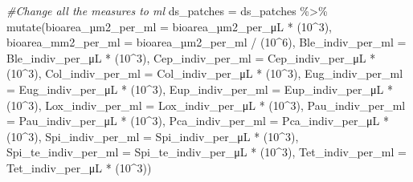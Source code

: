 \documentclass[
]{article}
\newenvironment{Shaded}{\begin{snugshade}}{\end{snugshade}}
\newcommand{\AttributeTok}[1]{\textcolor[rgb]{0.77,0.63,0.00}{#1}}
\newcommand{\CommentTok}[1]{\textcolor[rgb]{0.56,0.35,0.01}{\textit{#1}}}
\newcommand{\DecValTok}[1]{\textcolor[rgb]{0.00,0.00,0.81}{#1}}
\newcommand{\FunctionTok}[1]{\textcolor[rgb]{0.00,0.00,0.00}{#1}}
\newcommand{\NormalTok}[1]{#1}
\newcommand{\OtherTok}[1]{\textcolor[rgb]{0.56,0.35,0.01}{#1}}
\newcommand{\SpecialCharTok}[1]{\textcolor[rgb]{0.00,0.00,0.00}{#1}}
\begin{document}
\begin{Shaded}
\begin{Highlighting}[]
\CommentTok{\#Change all the measures to ml}
\NormalTok{ds\_patches }\OtherTok{=}\NormalTok{ ds\_patches }\SpecialCharTok{\%\textgreater{}\%}
  \FunctionTok{mutate}\NormalTok{(bioarea\_µ}\AttributeTok{m2\_per\_ml =}\NormalTok{ bioarea\_µm2\_per\_μL }\SpecialCharTok{*}\NormalTok{ (}\DecValTok{10}\SpecialCharTok{\^{}}\DecValTok{3}\NormalTok{),}
         \AttributeTok{bioarea\_mm2\_per\_ml =}\NormalTok{ bioarea\_µm2\_per\_ml }\SpecialCharTok{/}\NormalTok{ (}\DecValTok{10}\SpecialCharTok{\^{}}\DecValTok{6}\NormalTok{),}
         \AttributeTok{Ble\_indiv\_per\_ml =}\NormalTok{ Ble\_indiv\_per\_μL }\SpecialCharTok{*}\NormalTok{ (}\DecValTok{10}\SpecialCharTok{\^{}}\DecValTok{3}\NormalTok{),}
         \AttributeTok{Cep\_indiv\_per\_ml =}\NormalTok{ Cep\_indiv\_per\_μL }\SpecialCharTok{*}\NormalTok{ (}\DecValTok{10}\SpecialCharTok{\^{}}\DecValTok{3}\NormalTok{),}
         \AttributeTok{Col\_indiv\_per\_ml =}\NormalTok{ Col\_indiv\_per\_μL }\SpecialCharTok{*}\NormalTok{ (}\DecValTok{10}\SpecialCharTok{\^{}}\DecValTok{3}\NormalTok{),}
         \AttributeTok{Eug\_indiv\_per\_ml =}\NormalTok{ Eug\_indiv\_per\_μL }\SpecialCharTok{*}\NormalTok{ (}\DecValTok{10}\SpecialCharTok{\^{}}\DecValTok{3}\NormalTok{),}
         \AttributeTok{Eup\_indiv\_per\_ml =}\NormalTok{ Eup\_indiv\_per\_μL }\SpecialCharTok{*}\NormalTok{ (}\DecValTok{10}\SpecialCharTok{\^{}}\DecValTok{3}\NormalTok{),}
         \AttributeTok{Lox\_indiv\_per\_ml =}\NormalTok{ Lox\_indiv\_per\_μL }\SpecialCharTok{*}\NormalTok{ (}\DecValTok{10}\SpecialCharTok{\^{}}\DecValTok{3}\NormalTok{),}
         \AttributeTok{Pau\_indiv\_per\_ml =}\NormalTok{ Pau\_indiv\_per\_μL }\SpecialCharTok{*}\NormalTok{ (}\DecValTok{10}\SpecialCharTok{\^{}}\DecValTok{3}\NormalTok{),}
         \AttributeTok{Pca\_indiv\_per\_ml =}\NormalTok{ Pca\_indiv\_per\_μL }\SpecialCharTok{*}\NormalTok{ (}\DecValTok{10}\SpecialCharTok{\^{}}\DecValTok{3}\NormalTok{),}
         \AttributeTok{Spi\_indiv\_per\_ml =}\NormalTok{ Spi\_indiv\_per\_μL }\SpecialCharTok{*}\NormalTok{ (}\DecValTok{10}\SpecialCharTok{\^{}}\DecValTok{3}\NormalTok{),}
         \AttributeTok{Spi\_te\_indiv\_per\_ml =}\NormalTok{ Spi\_te\_indiv\_per\_μL }\SpecialCharTok{*}\NormalTok{ (}\DecValTok{10}\SpecialCharTok{\^{}}\DecValTok{3}\NormalTok{),}
         \AttributeTok{Tet\_indiv\_per\_ml =}\NormalTok{ Tet\_indiv\_per\_μL }\SpecialCharTok{*}\NormalTok{ (}\DecValTok{10}\SpecialCharTok{\^{}}\DecValTok{3}\NormalTok{))}
\end{Highlighting}
\end{Shaded}
\end{document}
